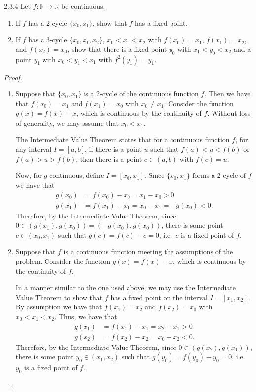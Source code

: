 \begin{problem}{2.3.4}
  Let $f: \mathbb{R} \to \mathbb{R}$ be continuous.
  \begin{enumerate}
    \item If $f$ has a 2-cycle $\{x_0, x_1\}$, show that $f$ has a fixed point.
    \item If $f$ has a 3-cycle $\{x_0, x_1, x_2\}$, $x_0 < x_1 < x_2$ with $f(x_0) = x_1$,
      $f(x_1) = x_2$, and $f(x_2) = x_0$, show that there is a fixed point $y_0$ with
      $x_1 < y_0 < x_2$ and a point $y_1$ with $x_0 < y_1 < x_1$ with $f^2(y_1) = y_1$.
  \end{enumerate}
 \end{problem}

\begin{proof}
  \begin{enumerate}
    \item Suppose that $\{x_0, x_1\}$ is a 2-cycle of the continuous function $f$. Then
      we have that $f(x_0) = x_1$ and $f(x_1) = x_0$ with $x_0 \neq x_1$. Consider
      the function $g(x) = f(x) - x$, which is continuous by the continuity of $f$.
      Without loss of generality, we may assume that $x_0 < x_1$.

      The Intermediate Value Theorem states that for a continuous function $f$,
      for any interval $I= [a,b]$, if there is a point $u$ such that $f(a) < u < f(b)$ or $f(a) > u > f(b)$,
      then there is a point $c \in (a, b)$ with $f(c) = u$.

      Now, for $g$ continuous, define $I = [x_0, x_1]$. Since $\{x_0, x_1\}$ forms
      a 2-cycle of $f$ we have that
      \begin{align*}
        g(x_0) &= f(x_0) - x_0 = x_1 - x_0 > 0\\
        g(x_1) &= f(x_1) - x_1 = x_0 - x_1 = - g(x_0) < 0.
      \end{align*}
      Therefore, by the Intermediate Value Theorem, since $0 \in (g(x_1), g(x_0)) = (-g(x_0), g(x_0))$,
      there is some point $c\in(x_0,x_1)$ such that $g(c) = f(c) - c = 0$, i.e.\
      $c$ is a fixed point of $f$.
    \item Suppose that $f$ is a continuous function meeting the assumptions of the problem.
      Consider the function $g(x) = f(x) - x$, which is continuous by the continuity of $f$.

      In a manner similar to the one used above, we may use the Intermediate Value Theorem
      to show that $f$ has a fixed point on the interval $I = [x_1, x_2]$. By assumption
      we have that $f(x_1) = x_2$ and $f(x_2) = x_0$ with $x_0 < x_1 < x_2$. Thus, we have that
      \begin{align*}
        g(x_1) &= f(x_1) - x_1 = x_2 - x_1 > 0\\
        g(x_2) &= f(x_2) - x_2 = x_0 - x_2 < 0.
      \end{align*}
      Therefore, by the Intermediate Value Theorem, since $0 \in (g(x_2), g(x_1))$,
      there is some point $y_0\in(x_1,x_2)$ such that $g(y_0) = f(y_0) - y_0 = 0$, i.e.\
      $y_0$ is a fixed point of $f$.


\end{enumerate}
\end{proof}

